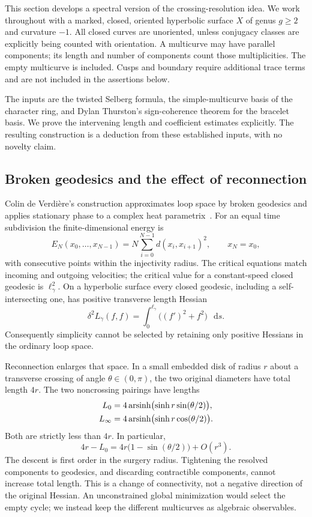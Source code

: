 \documentclass[11pt,a4paper]{article}
\numberwithin{equation}{section}
\theoremstyle{definition}
\theoremstyle{remark}
\DeclareMathOperator{\arsinh}{arsinh}
\newcommand{\dd}{\mathop{}\!\mathrm d}
\begin{document}
This section develops a spectral version of the crossing-resolution
idea. We work throughout with a marked, closed, oriented hyperbolic
surface $X$ of genus $g\geq2$ and curvature $-1$. All closed curves
are unoriented, unless conjugacy classes are explicitly being counted
with orientation. A multicurve may have parallel components; its
length and number of components count those multiplicities. The
empty multicurve is included. Cusps and boundary require additional
trace terms and are not included in the assertions below.

The inputs are the twisted Selberg formula, the simple-multicurve
basis of the character ring, and Dylan Thurston's sign-coherence
theorem for the bracelet basis. We prove the intervening length and
coefficient estimates explicitly. The resulting construction is a
deduction from these established inputs, with no novelty claim.

\subsection{Broken geodesics and the effect of reconnection}

Colin de Verdi\`ere's construction approximates loop space by broken
geodesics and applies stationary phase to a complex heat
parametrix~\cite{CdVPeriodic}. For an equal time subdivision the
finite-dimensional energy is
\[
 E_N(x_0,\ldots,x_{N-1})
 =N\sum_{i=0}^{N-1}d(x_i,x_{i+1})^2,\qquad x_N=x_0,
\]
with consecutive points within the injectivity radius. The critical
equations match incoming and outgoing velocities; the critical
value for a constant-speed closed geodesic is $\ell_\gamma^2$.
On a hyperbolic surface every closed geodesic, including a
self-intersecting one, has positive transverse length Hessian
\[
 \delta^2L_\gamma(f,f)
 =\int_0^{\ell_\gamma}\bigl((f')^2+f^2\bigr)\,\dd s.
\]
Consequently simplicity cannot be selected by retaining only
positive Hessians in the ordinary loop space.

Reconnection enlarges that space. In a small embedded disk of radius
$r$ about a transverse crossing of angle $\theta\in(0,\pi)$, the two
original diameters have total length $4r$. The two noncrossing
pairings have lengths
\begin{align}
 L_0&=4\arsinh\bigl(\sinh r\sin(\theta/2)\bigr),\notag\\
 L_\infty&=4\arsinh\bigl(\sinh r\cos(\theta/2)\bigr).
 \label{eq:coeffuncrossing}
\end{align}
Both are strictly less than $4r$. In particular,
\[
 4r-L_0=4r\bigl(1-\sin(\theta/2)\bigr)+O(r^3).
\]
The descent is first order in the surgery radius. Tightening the
resolved components to geodesics, and discarding contractible
components, cannot increase total length. This is a change of
connectivity, not a negative direction of the original Hessian.
An unconstrained global minimization would select the empty cycle;
we instead keep the different multicurves as algebraic observables.
\end{document}
